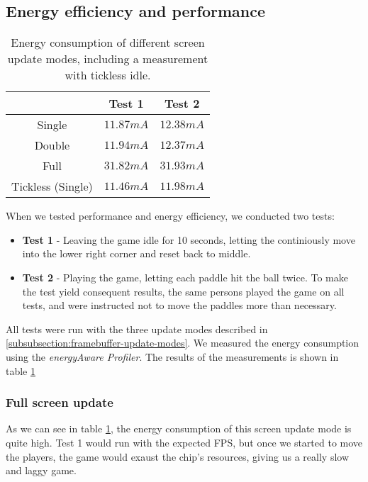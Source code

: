 \subsection{Energy efficiency and performance}
\begin{table}
	\label{table:energy_consumption}
	\centering
	\begin{tabular}{c|c|c}
		\hline
		\hline
		& Test 1 & Test 2\\
		\hline
		Single & $11.87mA$ & $12.38mA$ \\
		Double & $11.94mA$ & $12.37mA$ \\
		Full & $31.82mA$ & $31.93mA$ \\
		\hline
		Tickless (Single) & $11.46mA$ & $11.98mA$ \\
		\hline
		
	
	\end{tabular}
	\caption{Energy consumption of different screen update modes, including a measurement with tickless idle.}
\end{table}
When we tested performance and energy efficiency, we conducted two tests:
\begin{itemize}
	\item \textbf{Test 1}  - Leaving the game idle for 10 seconds, letting the continiously move into the lower right corner and reset back to middle.
	\item \textbf{Test 2} - Playing the game, letting each paddle hit the ball twice. To make the test yield consequent results, the same persons played the game on all tests, and were instructed not to move the paddles more than necessary.
\end{itemize}

All tests were run with the three update modes described in \ref{subsubsection:framebuffer-update-modes}. We measured the energy consumption using the \emph{energyAware Profiler}. The results of the measurements is shown in table \ref{table:energy_consumption}



\subsubsection{Full screen update}
As we can see in table \ref{table:energy_consumption}, the energy consumption of this screen update mode is quite high. Test 1 would run with the expected FPS, but once we started to move the players, the game would exaust the chip's resources, giving us a really slow and laggy game.

